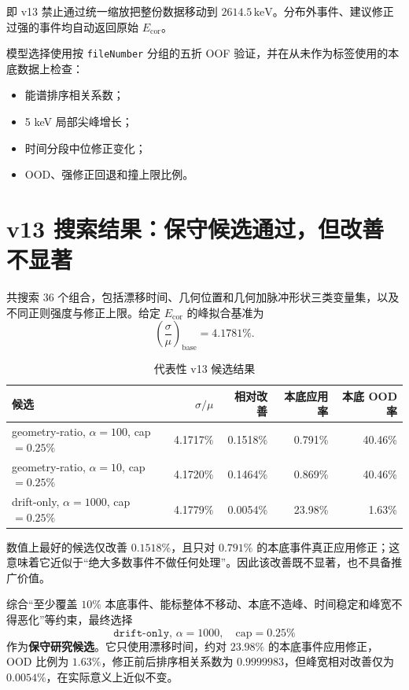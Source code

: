 \documentclass[UTF8,11pt,a4paper]{ctexart}
\begin{document}
即 v13 禁止通过统一缩放把整份数据移动到 $2614.5\,\mathrm{keV}$。分布外事件、建议修正过强的事件均自动返回原始 $E_{\mathrm{cor}}$。

模型选择使用按 \texttt{fileNumber} 分组的五折 OOF 验证，并在从未作为标签使用的本底数据上检查：
\begin{itemize}
  \item 能谱排序相关系数；
  \item 5 keV 局部尖峰增长；
  \item 时间分段中位修正变化；
  \item OOD、强修正回退和撞上限比例。
\end{itemize}

\section{v13 搜索结果：保守候选通过，但改善不显著}

共搜索 36 个组合，包括漂移时间、几何位置和几何加脉冲形状三类变量集，以及不同正则强度与修正上限。给定 $E_{\mathrm{cor}}$ 的峰拟合基准为
\begin{equation}
  \left(\frac{\sigma}{\mu}\right)_{\mathrm{base}}=4.1781\%.
\end{equation}

\begin{table}[H]
\centering
\caption{代表性 v13 候选结果}
\begin{tabularx}{\textwidth}{>{\raggedright\arraybackslash}Xrrrr}
\toprule
候选 & $\sigma/\mu$ & 相对改善 & 本底应用率 & 本底 OOD率\\
\midrule
geometry-ratio, $\alpha=100$, cap $=0.25\%$ & 4.1717\% & 0.1518\% & 0.791\% & 40.46\%\\
geometry-ratio, $\alpha=10$, cap $=0.25\%$  & 4.1720\% & 0.1464\% & 0.869\% & 40.46\%\\
drift-only, $\alpha=1000$, cap $=0.25\%$ & 4.1779\% & 0.0054\% & 23.98\% & 1.63\%\\
\bottomrule
\end{tabularx}
\end{table}

数值上最好的候选仅改善 $0.1518\%$，且只对 $0.791\%$ 的本底事件真正应用修正；这意味着它近似于“绝大多数事件不做任何处理”。因此该改善既不显著，也不具备推广价值。

综合“至少覆盖 $10\%$ 本底事件、能标整体不移动、本底不造峰、时间稳定和峰宽不得恶化”等约束，最终选择
\begin{equation}
  \texttt{drift-only, }\alpha=1000,\quad \mathrm{cap}=0.25\%
\end{equation}
作为\textbf{保守研究候选}。它只使用漂移时间，约对 $23.98\%$ 的本底事件应用修正，OOD 比例为 $1.63\%$，修正前后排序相关系数为 $0.9999983$，但峰宽相对改善仅为 $0.0054\%$，在实际意义上近似不变。
\end{document}
